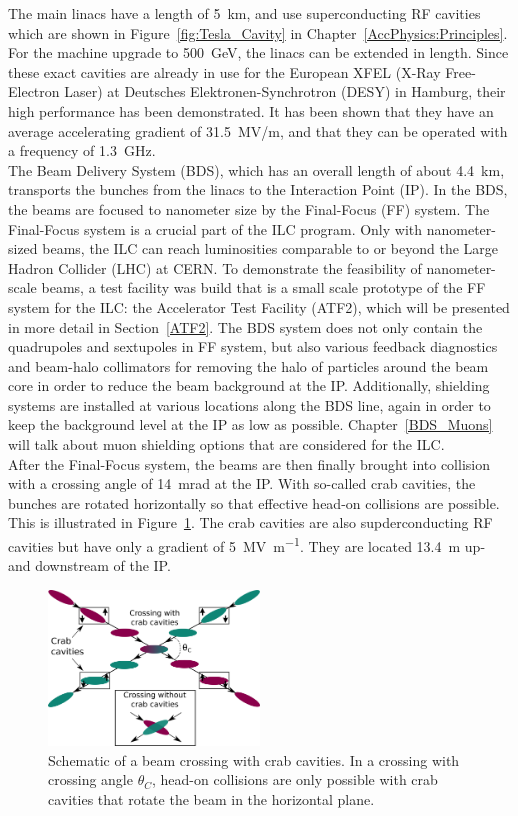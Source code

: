 The main linacs have a length of \SI{5}{\kilo\meter}, and use superconducting RF cavities which are shown in Figure~\ref{fig:Tesla_Cavity} in Chapter~\ref{AccPhysics:Principles}. 
For the machine upgrade to \SI{500}{\GeV}, the linacs can be extended in length.
Since these exact cavities are already in use for the European XFEL (X-Ray Free-Electron Laser) at Deutsches Elektronen-Synchrotron (DESY) in Hamburg, their high performance has been demonstrated.
It has been shown that they have an average accelerating gradient of \SI{31.5}{MV/m}, and that they can be operated with a frequency of \SI{1.3}{\giga\hertz}.~\cite{Walker}\\
The Beam Delivery System (BDS), which has an overall length of about \SI{4.4}{\kilo\meter}, transports the bunches from the linacs to the Interaction Point (IP).
In the BDS, the beams are focused to nanometer size by the Final-Focus (FF) system.
The Final-Focus system is a crucial part of the ILC program.
Only with nanometer-sized beams, the ILC can reach luminosities comparable to or beyond the Large Hadron Collider (LHC) at CERN.
To demonstrate the feasibility of nanometer-scale beams, a test facility was build that is a small scale prototype of the FF system for the ILC: the Accelerator Test Facility (ATF2), which will be presented in more detail in Section~\ref{ATF2}.
The BDS system does not only contain the quadrupoles and sextupoles in FF system, but also various feedback diagnostics and beam-halo collimators for removing the halo of particles around the beam core in order to reduce the beam background at the IP. 
Additionally, shielding systems are installed at various locations along the BDS line, again in order to keep the background level at the IP as low as possible.
Chapter~\ref{BDS_Muons} will talk about muon shielding options that are considered for the ILC.
\\After the Final-Focus system, the beams are then finally brought into collision with a crossing angle of \SI{14}{mrad} at the IP.\cite[p. 9-10]{TDR1}
With so-called crab cavities, the bunches are rotated horizontally so that effective head-on collisions are possible.
This is illustrated in Figure~\ref{fig:Crab_crossing}.
The crab cavities are also supderconducting RF cavities but have only a gradient of \SI{5}{\mega\volt\per\meter}.
They are located \SI{13.4}{\meter} up- and downstream of the IP.~\cite[p. 154]{TDR32}
\begin{figure}
\centering
\includegraphics[width=0.5\textwidth]{Figures/Crab_crossing.png}
\caption[Schematic of a beam crossing with crab cavities]{Schematic of a beam crossing with crab cavities. In a crossing with crossing angle $\theta_C$, head-on collisions are only possible with crab cavities that rotate the beam in the horizontal plane.}
\label{fig:Crab_crossing}
\end{figure}
